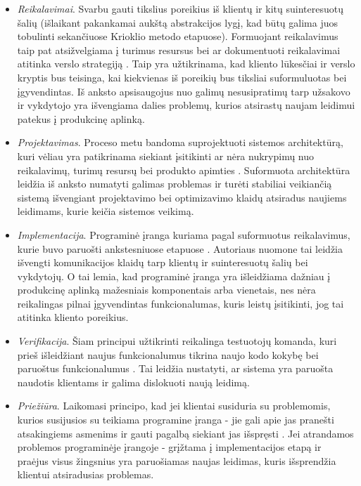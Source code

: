 \documentclass{VUMIFPSkursinis}
\begin{document}
\begin{itemize}
  \item \textit{Reikalavimai}. Svarbu gauti tikslius poreikius iš klientų ir kitų suinteresuotų šalių (išlaikant pakankamai aukštą abstrakcijos lygį, kad būtų galima juos tobulinti sekančiuose Krioklio metodo etapuose). Formuojant reikalavimus taip pat atsižvelgiama į turimus resursus bei ar dokumentuoti reikalavimai atitinka verslo strategiją \cite{SaltKetvirtas}. Taip yra užtikrinama, kad kliento lūkesčiai ir verslo kryptis bus teisinga, kai kiekvienas iš poreikių bus tiksliai suformuluotas bei įgyvendintas. Iš anksto apsisaugojus nuo galimų nesusipratimų tarp užsakovo ir vykdytojo yra išvengiama dalies problemų, kurios atsirastų naujam leidimui patekus į produkcinę aplinką.

  \item \textit{Projektavimas}. Proceso metu bandoma suprojektuoti sistemos architektūrą, kuri vėliau yra patikrinama siekiant įsitikinti ar nėra nukrypimų nuo reikalavimų, turimų resursų bei produkto apimties \cite{SaltKetvirtas}. Suformuota architektūra leidžia iš anksto numatyti galimas problemas ir turėti stabiliai veikiančią sistemą išvengiant projektavimo bei optimizavimo klaidų atsiradus naujiems leidimams, kurie keičia sistemos veikimą. 
  
  \item \textit{Implementacija}. Programinė įranga kuriama pagal suformuotus reikalavimus, kurie buvo paruošti ankstesniuose etapuose \cite{SaltPenktas}.  Autoriaus nuomone tai leidžia išvengti komunikacijos klaidų tarp klientų ir suinteresuotų šalių bei vykdytojų. O tai lemia, kad programinė įranga yra išleidžiama dažniau į produkcinę aplinką mažesniais komponentais arba vienetais, nes nėra reikalingas pilnai įgyvendintas funkcionalumas, kuris leistų įsitikinti, jog tai atitinka kliento poreikius.
  
  \item \textit{Verifikacija}. Šiam principui užtikrinti reikalinga testuotojų komanda, kuri prieš išleidžiant naujus funkcionalumus tikrina naujo kodo kokybę bei paruoštus funkcionalumus \cite{SaltKetvirtas}. Tai leidžia nustatyti, ar sistema yra paruošta naudotis klientams ir galima dislokuoti naują leidimą.
  
  \item \textit{Priežiūra}. Laikomasi principo, kad jei klientai susiduria su problemomis, kurios susijusios su teikiama programine įranga - jie gali apie jas pranešti atsakingiems asmenims ir gauti pagalbą siekiant jas išspręsti \cite{SaltKetvirtas}. Jei atrandamos problemos programinėje įrangoje - grįžtama į implementacijos etapą ir praėjus visus žingsnius yra paruošiamas naujas leidimas, kuris išsprendžia klientui atsiradusias problemas.
\end{itemize}
\end{document}

